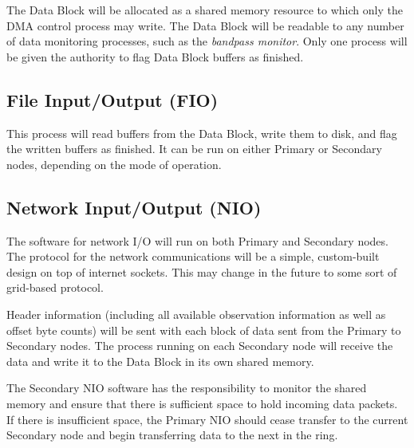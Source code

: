 The Data Block will be allocated as a shared memory resource to which
only the DMA control process may write.  The Data Block will be
readable to any number of data monitoring processes, such as the
\emph{bandpass monitor}.  Only one process will be given the authority
to flag Data Block buffers as finished.

\subsection{File Input/Output (FIO)}

This process will read buffers from the Data Block, write them to
disk, and flag the written buffers as finished.  It can be run on
either Primary or Secondary nodes, depending on the mode of operation.

\subsection{Network Input/Output (NIO)}

The software for network I/O will run on both Primary and Secondary
nodes.  The protocol for the network communications will be a simple,
custom-built design on top of internet sockets.  This may change in
the future to some sort of grid-based protocol.

Header information (including all available observation information as
well as offset byte counts) will be sent with each block of data sent
from the Primary to Secondary nodes.  The process running on each
Secondary node will receive the data and write it to the Data Block in
its own shared memory.

The Secondary NIO software has the responsibility to monitor the
shared memory and ensure that there is sufficient space to hold
incoming data packets.  If there is insufficient space, the Primary
NIO should cease transfer to the current Secondary node and begin
transferring data to the next in the ring.
